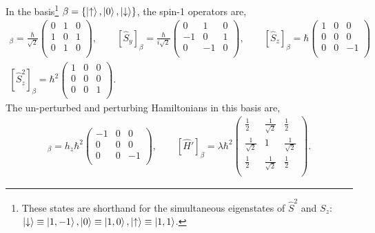 \documentclass[10pt]{article}
\newcommand{\1}{\mathbf 1}
\begin{document}
In the basis\footnote{
	These states are shorthand for the simultaneous eigenstates of $\hat S^2$ and $S_z$: $\ket{\downarrow }\equiv\ket{1,-1},\ket{0} \equiv \ket{1,0},\ket{\uparrow} \equiv\ket{1,1}$.
}
$\beta = \{\ket{\uparrow}, \ket{0}, \ket{\downarrow}\}$, the spin-1 operators are,
\begin{gather}
	[\hat S_x]_\beta
	=
	\frac{\hbar}{\sqrt{2}}
	\left(
		\begin{array}{ccc}
		 0 & 1 & 0 \\
		 1 & 0 & 1 \\
		 0 & 1 & 0 \\
		\end{array}
	\right),
	\qquad
	[\hat S_y]_\beta
	=
	\frac{\hbar}{i\sqrt{2}}
	\left(
\begin{array}{ccc}
 0 & 1 & 0 \\
 -1 & 0 & 1 \\
 0 & -1 & 0 \\
\end{array}
\right),
\qquad
[\hat S_z]_\beta
=
\hbar
\left(
\begin{array}{ccc}
 1 & 0 & 0 \\
 0 & 0 & 0 \\
 0 & 0 & -1 \\
\end{array}
\right)\\
[\hat S_z^2]_\beta
=
\hbar^2
\left(
\begin{array}{ccc}
 1 & 0 & 0 \\
 0 & 0 & 0 \\
 0 & 0 & 1 \\
\end{array}
\right).
\end{gather}
The un-perturbed and perturbing Hamiltonians in this basis are,
\begin{align}
	[\hat H_0]_\beta
	=h_z\hbar^2
	\left(
	\begin{array}{ccc}
	 -1 & 0 & 0 \\
	 0 & 0 & 0 \\
	 0 & 0 & -1 \\
	\end{array}
	\right)
	,\qquad
	[\hat H']_\beta
	=
	\lambda
	\hbar^2
	\left(
		\begin{array}{ccc}
		 \frac{1}{2} & \frac{1}{\sqrt{2}} & \frac{1}{2} \\
		 \frac{1}{\sqrt{2}} & 1 & \frac{1}{\sqrt{2}} \\
		 \frac{1}{2} & \frac{1}{\sqrt{2}} & \frac{1}{2} \\
		\end{array}
		\right).
\end{align}
\end{document}

